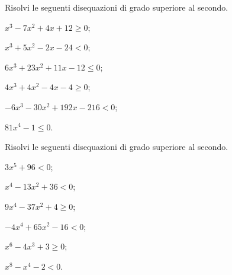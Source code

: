 \begin{esercizio}
 \label{ese:4.52}
Risolvi le seguenti disequazioni di grado superiore al secondo.
\begin{multicols}{2}
\begin{enumeratea}
\item $x^3-7x^2+4x+12\ge 0$;
\item $x^3+5x^2-2x-24<0$;
\item $6x^3+23x^2+11x-12\le 0$;
\item $4x^3+4x^2-4x-4\ge 0$;
\item $-6x^3-30x^2+192x-216<0$;
\item $81x^4-1\le 0$.
\end{enumeratea}
\end{multicols}
\end{esercizio}

\begin{esercizio}
 \label{ese:4.53}
Risolvi le seguenti disequazioni di grado superiore al secondo.
\begin{multicols}{2}
\begin{enumeratea}
\item $3x^5+96<0$;
\item $x^4-13x^2+36<0$;
\item $9x^4-37x^2+4\ge 0$;
\item $-4x^4+65x^2-16<0$;
\item $x^6-4x^3+3\ge 0$;
\item $x^8-x^4-2<0$.
\end{enumeratea}
\end{multicols}
\end{esercizio}

